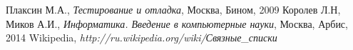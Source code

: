 \begin{thebibliography}{99}

  Плаксин М.А.,
  \emph{Тестирование и отладка},
  Москва, Бином,
  2009
  Королев Л.Н, Миков А.И.,
  \emph{Информатика. Введение в компьютерные науки},
  Москва, Арбис,
  2014
  Wikipedia,
  \emph{http://ru.wikipedia.org/wiki/Связные\_списки}
\end{thebibliography}
\pagebreak
